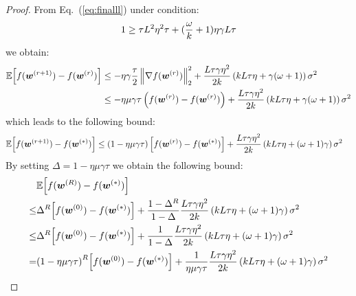 \documentclass[twoside]{article}
\begin{document}
\begin{proof}
From Eq.~(\ref{eq:finalll}) under condition:
\begin{align}\notag
       1\geq {\tau L^2\eta^2\tau}+{{(\frac{\omega}{k}+1)}\eta\gamma L}{\tau} 
\end{align}
we obtain:
\begin{align}\notag
         \mathbb{E}\Big[f({\boldsymbol{w}}^{(r+1)})-f({\boldsymbol{w}}^{(r)})\Big]&\leq -\eta\gamma\frac{\tau}{2}\left\|\nabla f({\boldsymbol{w}}^{(r)})\right\|_2^2+\frac{L\tau\gamma\eta^2 }{2k}\left(kL\tau\eta+\gamma(\omega+1)\right)\sigma^2\nonumber\\
         &\leq -\eta\mu\gamma{\tau} \left(f({\boldsymbol{w}}^{(r)})-f({\boldsymbol{w}}^{(r)})\right)+\frac{L\tau\gamma\eta^2 }{2k}\left(kL\tau\eta+\gamma(\omega+1)\right)\sigma^2 
\end{align}
which leads to the following bound:
\begin{align}\notag
            \mathbb{E}\Big[f({\boldsymbol{w}}^{(r+1)})-f({\boldsymbol{w}}^{(*)})\Big]&\leq \left(1-\eta\mu\gamma{\tau}\right) \Big[f({\boldsymbol{w}}^{(r)})-f({\boldsymbol{w}}^{(*)})\Big]+\frac{L\tau\gamma\eta^2 }{2k}\left(kL\tau\eta+{(\omega+1)}\gamma\right)\sigma^2
\end{align}
By setting $\Delta=1-\eta\mu\gamma{\tau}$ we obtain  the following bound:
\begin{align}\notag
            &\mathbb{E}\Big[f({\boldsymbol{w}}^{(R)})-f({\boldsymbol{w}}^{(*)})\Big]\nonumber\\
            \leq& \Delta^R \Big[f({\boldsymbol{w}}^{(0)})-f({\boldsymbol{w}}^{(*)})\Big]+\frac{1-\Delta^R}{1-\Delta}\frac{L\tau\gamma\eta^2 }{2k}\left(kL\tau\eta+{(\omega+1)}\gamma\right)\sigma^2\nonumber\\
            \leq& \Delta^R \Big[f({\boldsymbol{w}}^{(0)})-f({\boldsymbol{w}}^{(*)})\Big]+\frac{1}{1-\Delta}\frac{L\tau\gamma\eta^2 }{2k}\left(kL\tau\eta+{(\omega+1)}\gamma\right)\sigma^2\nonumber\\
            =&{\left(1-\eta\mu\gamma{\tau}\right)}^R \Big[f({\boldsymbol{w}}^{(0)})-f({\boldsymbol{w}}^{(*)})\Big]+\frac{1}{\eta\mu\gamma{\tau}}\frac{L\tau\gamma\eta^2 }{2k}\left(kL\tau\eta+{(\omega+1)}\gamma\right)\sigma^2
\end{align}
\end{proof}
\end{document}
